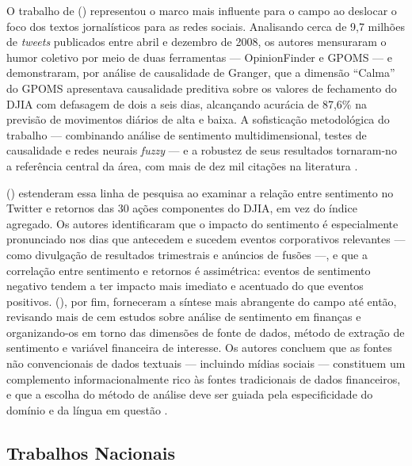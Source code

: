O trabalho de \citeauthor{bollen2011} (\citeyear{bollen2011}) representou o marco mais influente para o campo ao deslocar o foco dos textos jornalísticos para as redes sociais. Analisando cerca de 9,7 milhões de \textit{tweets} publicados entre abril e dezembro de 2008, os autores mensuraram o humor coletivo por meio de duas ferramentas --- OpinionFinder e GPOMS --- e demonstraram, por análise de causalidade de Granger, que a dimensão ``Calma'' do GPOMS apresentava causalidade preditiva sobre os valores de fechamento do DJIA com defasagem de dois a seis dias, alcançando acurácia de 87,6\% na previsão de movimentos diários de alta e baixa. A sofisticação metodológica do
trabalho --- combinando análise de sentimento multidimensional, testes de causalidade e redes neurais \textit{fuzzy} --- e a robustez de seus resultados tornaram-no a referência central da área, com mais de dez mil citações na literatura \cite{bollen2011}.

\citeauthor{ranco2015} (\citeyear{ranco2015}) estenderam essa linha de pesquisa ao examinar a relação entre sentimento no Twitter e retornos das 30 ações componentes do DJIA, em vez do índice agregado. Os autores identificaram que o impacto do sentimento é especialmente pronunciado nos dias que antecedem e sucedem eventos corporativos relevantes --- como divulgação de resultados trimestrais e anúncios de fusões ---, e que a correlação entre sentimento e retornos é assimétrica: eventos de sentimento negativo tendem a ter impacto mais imediato e acentuado do que eventos positivos. \citeauthor{kearney2014} (\citeyear{kearney2014}), por fim, forneceram a síntese mais abrangente do campo até então, revisando mais de cem estudos sobre análise de sentimento em finanças e organizando-os em torno das dimensões de fonte de dados, método de extração de sentimento e variável financeira de interesse. Os autores concluem que as fontes não convencionais de dados textuais --- incluindo mídias sociais --- constituem um complemento informacionalmente rico às fontes tradicionais de dados financeiros, e que a escolha do método de análise deve ser guiada pela especificidade do domínio e da língua em questão \cite{kearney2014}.


\subsection{Trabalhos Nacionais}
\label{subsec:trab_nacionais}

